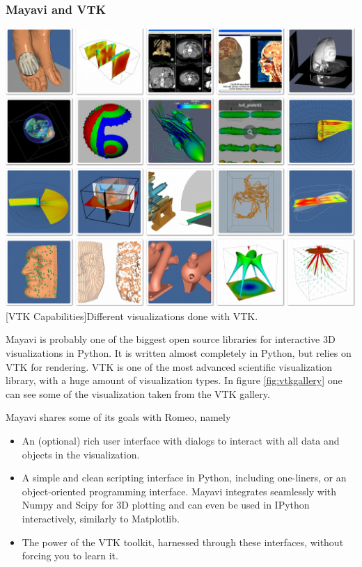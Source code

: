\subsubsection{Mayavi and VTK}
\vspace{1em}
\begin{minipage}{\linewidth}
    \centering
    \includegraphics[width=0.9\linewidth]{graphics/vtk.jpg}
    [VTK Capabilities]{Different visualizations done with VTK.}
    \label{fig:vtkgallery}
\end{minipage}

Mayavi is probably one of the biggest open source libraries for interactive 3D visualizations in Python.
It is written almost completely in Python, but relies on \ac{VTK} for rendering.
\ac{VTK} is one of the most advanced scientific visualization library, with a huge amount of visualization types. 
In figure \ref{fig:vtkgallery} one can see some of the visualization taken from the \ac{VTK} gallery\cite{VTKGallery}.

Mayavi shares some of its goals with Romeo, namely\cite{MayaviGoals}
\begin{itemize}
	\item An (optional) rich user interface with dialogs to interact with all data and objects in the visualization.
	\item A simple and clean scripting interface in Python, including one-liners, or an object-oriented programming interface. Mayavi integrates seamlessly with Numpy and Scipy for 3D plotting and can even be used in IPython interactively, similarly to Matplotlib.
	\item The power of the VTK toolkit, harnessed through these interfaces, without forcing you to learn it.
\end{itemize}

